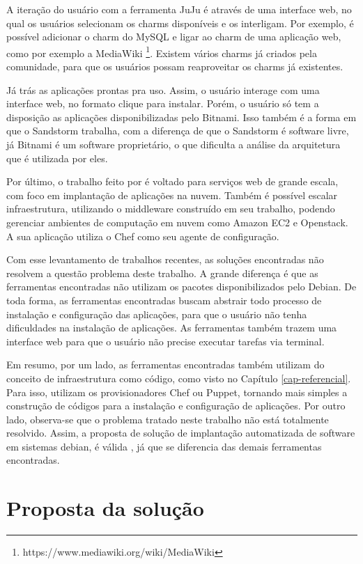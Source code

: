 A iteração do usuário com a ferramenta JuJu é através de uma interface web, 
no qual os usuários selecionam os charms disponíveis e os interligam. 
Por exemplo, é possível adicionar o charm do MySQL e ligar ao charm de uma aplicação
web, como por exemplo a MediaWiki \footnote{https://www.mediawiki.org/wiki/MediaWiki}. Existem
vários charms já criados pela comunidade, para que os usuários possam reaproveitar
os charms já existentes.
 
Já  trás as aplicações prontas pra uso. Assim, o usuário interage com 
uma interface web, no formato clique para instalar. Porém,
o usuário só tem a disposição as aplicações disponibilizadas pelo Bitnami. Isso
também é a forma em que o Sandstorm trabalha, com a diferença de que o Sandstorm é
software livre, já Bitnami é um software proprietário, o que dificulta a análise da arquitetura
que é utilizada por eles. 

Por último, o trabalho feito por  é voltado
para serviços web de grande escala, com foco em implantação de aplicações na
nuvem. Também é possível escalar infraestrutura, utilizando o middleware construído 
em seu trabalho, podendo gerenciar ambientes de computação em nuvem como Amazon EC2 e 
Openstack. A sua aplicação utiliza o Chef como seu agente de configuração.

Com esse levantamento de trabalhos recentes, as soluções encontradas não resolvem a questão problema deste trabalho. A grande diferença é que as ferramentas encontradas não utilizam os pacotes
disponibilizados pelo Debian. De toda forma, as ferramentas encontradas buscam
abstrair todo processo de instalação e configuração das aplicações, para que o
usuário não tenha dificuldades na instalação de aplicações. As ferramentas também
trazem uma interface web para que o usuário não precise executar tarefas via terminal.

Em resumo, por um lado, as ferramentas encontradas também utilizam do conceito de
infraestrutura como código, como visto no Capítulo \ref{cap-referencial}. Para
isso, utilizam os provisionadores Chef ou Puppet, tornando mais simples a
construção de códigos para a instalação e configuração de aplicações. Por outro lado, 
observa-se que o problema tratado neste trabalho não está totalmente resolvido. Assim, 
a proposta de solução de implantação automatizada de software em sistemas debian, é válida
, já que se diferencia das demais ferramentas encontradas.

\section{Proposta da solução}
\label{section:construcao}


